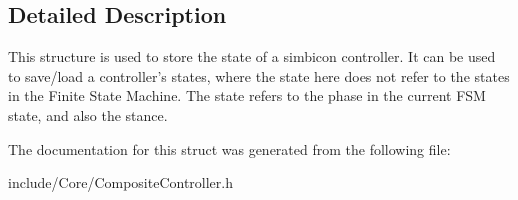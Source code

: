 \subsection{Detailed Description}
This structure is used to store the state of a simbicon controller. It can be used to save/load a controller's states, where the state here does not refer to the states in the Finite State Machine. The state refers to the phase in the current FSM state, and also the stance. 

The documentation for this struct was generated from the following file:\begin{DoxyCompactItemize}
\item 
include/Core/CompositeController.h\end{DoxyCompactItemize}

